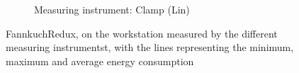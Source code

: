 \begin{figure}[H]
\begin{subfigure}[b]{0.49\linewidth}
\caption{Measuring instrument: Clamp (Lin)}\label{fig:time_series_Fankuch_WorkstationClampL}
\end{subfigure}
\caption{FannkuchRedux, on the workstation measured by the different measuring instrumentst, with the lines representing the minimum, maximum and average energy consumption}\label{fig:time_series_Fankuch_Workstation}
\end{figure}